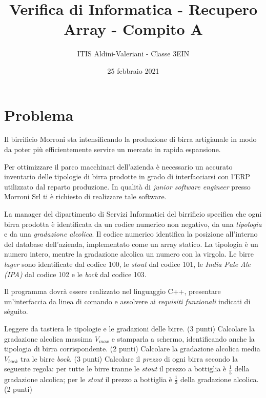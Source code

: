 \documentclass[a4paper, 11pt]{exam}
\title{Verifica di Informatica - Recupero Array - Compito A}
\author{ITIS Aldini-Valeriani - Classe 3EIN}
\date{25 febbraio 2021}
\begin{document}
\maketitle
\begin{center}

\end{center}
\vspace{1em}

\section*{Problema}

Il birrificio Morroni sta intensificando la produzione di birra artigianale in modo da poter più efficientemente servire un mercato in rapida espansione.

Per ottimizzare il parco macchinari dell'azienda è necessario un accurato inventario delle tipologie di birra prodotte in grado di interfacciarsi con l'ERP utilizzato dal reparto produzione.
In qualità di \emph{junior software engineer} presso Morroni Srl ti è richiesto di realizzare tale software.

La manager del dipartimento di Servizi Informatici del birrificio specifica che ogni birra prodotta è identificata da un codice numerico non negativo, da una \emph{tipologia} e da una \emph{gradazione alcolica}.
Il codice numerico identifica la posizione all'interno del database dell'azienda, implementato come un array statico. 
La tipologia è un numero intero, mentre la gradazione alcolica un numero con la virgola.
Le birre \emph{lager} sono identificate dal codice 100, le \emph{stout} dal codice 101, le \emph{India Pale Ale (IPA)} dal codice 102 e le \emph{bock} dal codice 103.

Il programma dovrà essere realizzato nel linguaggio C++, presentare un'interfaccia da linea di comando e assolvere ai \textit{requisiti funzionali} indicati di séguito.

\begin{questions}
	\question Leggere da tastiera le tipologie e le gradazioni delle birre. (3 punti)
	\question Calcolare la gradazione alcolica massima $V_{max}$ e stamparla a schermo, identificando anche la tipologia di birra corrispondente. (2 punti)
	\question Calcolare la gradazione alcolica media $V_{bock}$ tra le birre \emph{bock}. (3 punti)
	\question Calcolare il \emph{prezzo} di ogni birra secondo la seguente regola: per tutte le birre tranne le \emph{stout} il prezzo a bottiglia è $\frac{1}{5}$ della gradazione alcolica; per le \emph{stout} il prezzo a bottiglia è $\frac{1}{3}$ della gradazione alcolica. (2 punti)
\end{questions}
\end{document}
